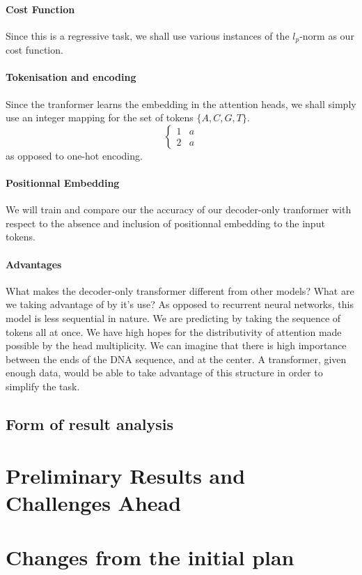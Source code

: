 \documentclass{article}
\begin{document}
\paragraph{Cost Function}
Since this is a regressive task, we shall use various instances of the 
$l_p$-norm as our cost function.

\paragraph{Tokenisation and encoding}
Since the tranformer learns the embedding in the attention heads, we
shall simply use an integer mapping for the set of tokens $\{A,C,G,T\}$.
\begin{equation}
    \begin{cases}
        1 & a \\
        2 & a 
    \end{cases}
\end{equation}
as opposed to one-hot encoding.
\paragraph{Positionnal Embedding}
We will train and compare our the accuracy of our decoder-only tranformer with 
respect to the absence and inclusion of positionnal embedding to the input tokens.

\paragraph{Advantages}
What makes the decoder-only transformer different from other models? What are
we taking advantage of by it's use? As opposed to recurrent neural networks, 
this model is less sequential in nature. We are predicting by 
taking the sequence of tokens all at once. We have high hopes for the 
distributivity of attention made possible by the head multiplicity.
We can imagine that there is high importance between the ends of the DNA 
sequence, and at the center. A transformer, given enough data, would 
be able to take advantage of this structure in order to simplify the task.


\subsection{Form of result analysis}

\section{Preliminary Results and Challenges Ahead}

\section{Changes from the initial plan}
\end{document}
